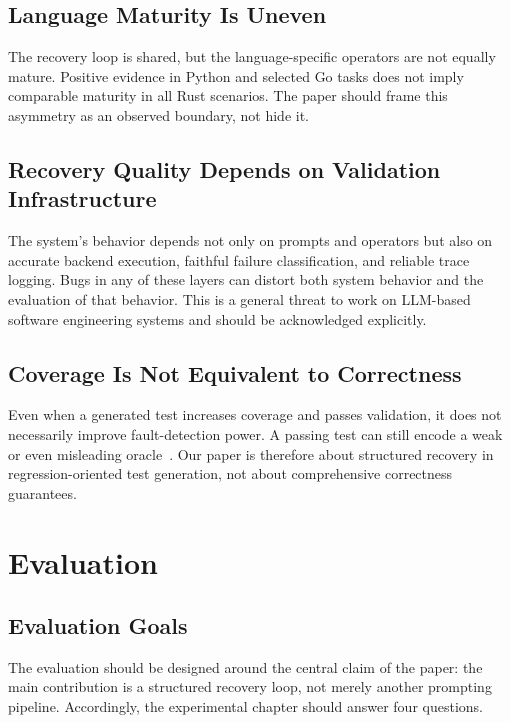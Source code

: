 \documentclass[10pt]{article}
\begin{document}
\subsection{Language Maturity Is Uneven}

The recovery loop is shared, but the language-specific operators are not equally mature. Positive evidence in Python and selected Go tasks does not imply comparable maturity in all Rust scenarios. The paper should frame this asymmetry as an observed boundary, not hide it.

\subsection{Recovery Quality Depends on Validation Infrastructure}

The system's behavior depends not only on prompts and operators but also on accurate backend execution, faithful failure classification, and reliable trace logging. Bugs in any of these layers can distort both system behavior and the evaluation of that behavior. This is a general threat to work on LLM-based software engineering systems and should be acknowledged explicitly.

\subsection{Coverage Is Not Equivalent to Correctness}

Even when a generated test increases coverage and passes validation, it does not necessarily improve fault-detection power. A passing test can still encode a weak or even misleading oracle~\cite{mathews2024designchoices}. Our paper is therefore about structured recovery in regression-oriented test generation, not about comprehensive correctness guarantees.

\section{Evaluation}

\subsection{Evaluation Goals}

The evaluation should be designed around the central claim of the paper: the main contribution is a structured recovery loop, not merely another prompting pipeline. Accordingly, the experimental chapter should answer four questions.
\end{document}
